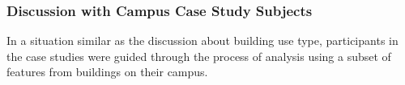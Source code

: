 \subsubsection{Discussion with Campus Case Study Subjects}
\label{sec:performanceclass_oncasestudy}

In a situation similar as the discussion about building use type, participants in the case studies were guided through the process of analysis using a subset of features from buildings on their campus. 